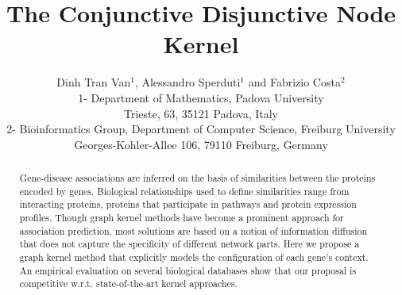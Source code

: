 \documentclass{esannV2}
\begin{document}
\title{The Conjunctive Disjunctive Node Kernel}

\author{Dinh Tran Van$^1$, Alessandro Sperduti$^1$ and Fabrizio Costa$^2$
%
%
\vspace{.3cm}\\
%
1- Department of Mathematics, Padova University\\
Trieste, 63, 35121 Padova, Italy
%
\vspace{.1cm}\\
2- Bioinformatics Group, Department of Computer Science, Freiburg University \\
Georges-Kohler-Allee 106, 79110 Freiburg, Germany\\
}

\maketitle

\begin{abstract} Gene-disease associations are inferred on the basis of
similarities between the proteins encoded by genes. Biological relationships
used to define similarities range from interacting proteins,
proteins that participate in pathways and protein expression profiles. Though
graph kernel methods have become a prominent approach for association
prediction, most solutions are based on a notion of information diffusion that
does not capture the specificity of different network parts. Here we propose a
graph kernel method that explicitly models the configuration of each gene's
context. An empirical evaluation on several biological databases show that our
proposal is competitive w.r.t. state-of-the-art kernel approaches.
\end{abstract}
\end{document}
